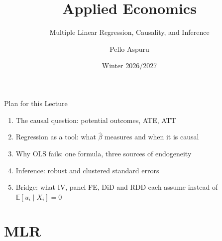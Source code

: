 \documentclass[9pt,aspectratio=169]{beamer}
\title{Applied Economics}
\subtitle{Multiple Linear Regression, Causality, and Inference}
\author{Pello Aspuru}
\date{Winter 2026/2027}
\newcommand{\E}{\mathbb{E}}
\begin{document}
{
  \begin{frame}
    \titlepage
  \end{frame}
}

\begin{frame}{Plan for this Lecture}
\linespread{1.2}\selectfont
  \begin{enumerate}
    \item The causal question: potential outcomes, ATE, ATT
    \item Regression as a tool: what $\hat\beta$ measures and when it is causal
    \item Why OLS fails: one formula, three sources of endogeneity
    \item Inference: robust and clustered standard errors
    \item Bridge: what IV, panel FE, DiD and RDD each assume instead of $\E[u_i\mid X_i]=0$
  \end{enumerate}
\end{frame}

\section{MLR}
\end{document}
